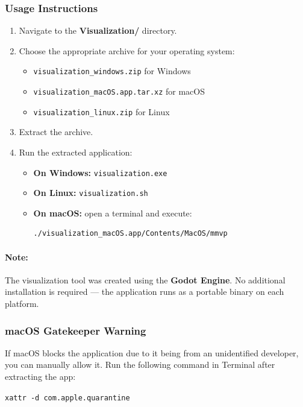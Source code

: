 \documentclass[a4paper,english,DIV=16,11pt,parskip=half,dvipsnames,listof=totoc,index=totoc,bibliography=totoc]{scrartcl}
\begin{document}
\subsubsection*{Usage Instructions}
\begin{enumerate}
  \item Navigate to the \textbf{Visualization/} directory.
  \item Choose the appropriate archive for your operating system:
  \begin{itemize}
    \item \texttt{visualization\_windows.zip} for Windows
    \item \texttt{visualization\_macOS.app.tar.xz} for macOS
    \item \texttt{visualization\_linux.zip} for Linux
  \end{itemize}
  \item Extract the archive.
  \item Run the extracted application:
  \begin{itemize}
    \item \textbf{On Windows:} \texttt{visualization.exe}
    \item \textbf{On Linux:} \texttt{visualization.sh}
    \item \textbf{On macOS:} open a terminal and execute:
    \begin{lstlisting}[language=bash]
./visualization_macOS.app/Contents/MacOS/mmvp
    \end{lstlisting}
  \end{itemize}

\end{enumerate}

\paragraph{Note:}
The visualization tool was created using the \textbf{Godot Engine}. No additional installation is required — the application runs as a portable binary on each platform.

\subsubsection*{macOS Gatekeeper Warning}
If macOS blocks the application due to it being from an unidentified developer, you can manually allow it. Run the following command in Terminal after extracting the app:

\texttt{xattr -d com.apple.quarantine} 
\end{document}

